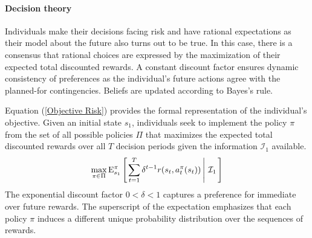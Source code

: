 \paragraph{Decision theory} Individuals make their decisions facing risk and have rational expectations as their model about the future also turns out to be true. In this case, there is a consensus that rational choices are expressed by the maximization of their expected total discounted rewards. A constant discount factor ensures dynamic consistency of preferences as the individual's future actions agree with the planned-for contingencies. Beliefs are updated according to Bayes's rule.

Equation (\ref{Objective Risk}) provides the formal representation of the individual's objective. Given an initial state $s_1$, individuals seek to implement the policy $\pi$ from the set of all possible policies $\Pi$ that maximizes the expected total discounted rewards over all $T$ decision periods given the information $\mathcal{I}_1$ available.
%
\begin{align}\label{Objective Risk}
\max_{\pi \in\Pi} \mathrm{E}_{s_1}^\pi\left[\left.\sum^{T}_{t = 1}  \delta^{t - 1} r(s_t, a^\pi_t(s_t))\,\right\vert\,\mathcal{I}_1\,\right]
\end{align}
%
The exponential discount factor $0 < \delta < 1$ captures a preference for immediate over future rewards. The superscript of the expectation emphasizes that each policy $\pi$ induces a different unique probability distribution over the sequences of rewards.
